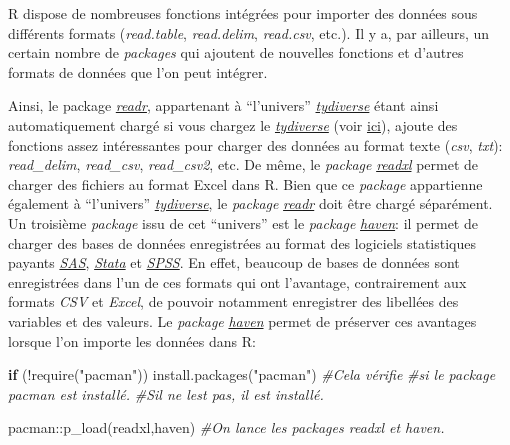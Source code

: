 \documentclass[
]{book}
\newenvironment{Shaded}{\begin{snugshade}}{\end{snugshade}}
\newcommand{\CommentTok}[1]{\textcolor[rgb]{0.56,0.35,0.01}{\textit{#1}}}
\newcommand{\ControlFlowTok}[1]{\textcolor[rgb]{0.13,0.29,0.53}{\textbf{#1}}}
\newcommand{\FunctionTok}[1]{\textcolor[rgb]{0.00,0.00,0.00}{#1}}
\newcommand{\NormalTok}[1]{#1}
\newcommand{\SpecialCharTok}[1]{\textcolor[rgb]{0.00,0.00,0.00}{#1}}
\newcommand{\StringTok}[1]{\textcolor[rgb]{0.31,0.60,0.02}{#1}}
\begin{document}
R dispose de nombreuses fonctions intégrées pour importer des données sous différents formats (\emph{read.table}, \emph{read.delim}, \emph{read.csv}, etc.). Il y a, par ailleurs, un certain nombre de \emph{packages} qui ajoutent de nouvelles fonctions et d'autres formats de données que l'on peut intégrer.

Ainsi, le package \href{https://readr.tidyverse.org/}{\emph{readr}}, appartenant à ``l'univers'' \href{https://www.tidyverse.org/}{\emph{tydiverse}} étant ainsi automatiquement chargé si vous chargez le \href{https://www.tidyverse.org/}{\emph{tydiverse}} (voir \protect\hyperlink{packages}{ici}), ajoute des fonctions assez intéressantes pour charger des données au format texte (\emph{csv}, \emph{txt}): \emph{read\_delim}, \emph{read\_csv}, \emph{read\_csv2}, etc. De même, le \emph{package} \href{https://readxl.tidyverse.org/}{\emph{readxl}} permet de charger des fichiers au format Excel dans R. Bien que ce \emph{package} appartienne également à ``l'univers'' \href{https://www.tidyverse.org/}{\emph{tydiverse}}, le \emph{package} \href{https://readr.tidyverse.org/}{\emph{readr}} doit être chargé séparément. Un troisième \emph{package} issu de cet ``univers'' est le \emph{package} \href{https://haven.tidyverse.org/}{\emph{haven}}: il permet de charger des bases de données enregistrées au format des logiciels statistiques payants \href{https://www.sas.com/}{\emph{SAS}}, \href{https://www.stata.com/}{\emph{Stata}} et \href{https://www.ibm.com/fr-fr/products/spss-statistics}{\emph{SPSS}}. En effet, beaucoup de bases de données sont enregistrées dans l'un de ces formats qui ont l'avantage, contrairement aux formats \emph{CSV} et \emph{Excel}, de pouvoir notamment enregistrer des libellées des variables et des valeurs. Le \emph{package} \href{https://haven.tidyverse.org/}{\emph{haven}} permet de préserver ces avantages lorsque l'on importe les données dans R:

\begin{Shaded}
\begin{Highlighting}[]
\ControlFlowTok{if}\NormalTok{ (}\SpecialCharTok{!}\FunctionTok{require}\NormalTok{(}\StringTok{"pacman"}\NormalTok{)) }\FunctionTok{install.packages}\NormalTok{(}\StringTok{"pacman"}\NormalTok{) }\CommentTok{\#Cela vérifie}
                             \CommentTok{\#si le package pacman est installé.}
                             \CommentTok{\#S\textquotesingle{}il ne l\textquotesingle{}est pas, il est installé.}

\NormalTok{pacman}\SpecialCharTok{::}\FunctionTok{p\_load}\NormalTok{(readxl,haven) }\CommentTok{\#On lance les packages readxl et haven.}
\end{Highlighting}
\end{Shaded}
\end{document}
